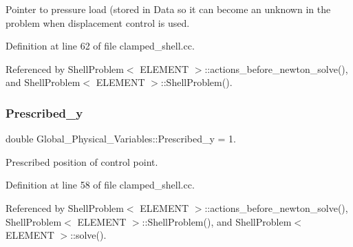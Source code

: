Pointer to pressure load (stored in Data so it can become an unknown in the problem when displacement control is used. 



Definition at line 62 of file clamped\+\_\+shell.\+cc.



Referenced by Shell\+Problem$<$ E\+L\+E\+M\+E\+N\+T $>$\+::actions\+\_\+before\+\_\+newton\+\_\+solve(), and Shell\+Problem$<$ E\+L\+E\+M\+E\+N\+T $>$\+::\+Shell\+Problem().

\mbox{\label{namespaceGlobal__Physical__Variables_aa2f7ea98cb8462b3920a026bed5f6099}} 
\subsubsection{\texorpdfstring{Prescribed\+\_\+y}{Prescribed\_y}}
{\footnotesize\ttfamily double Global\+\_\+\+Physical\+\_\+\+Variables\+::\+Prescribed\+\_\+y = 1.}



Prescribed position of control point. 



Definition at line 58 of file clamped\+\_\+shell.\+cc.



Referenced by Shell\+Problem$<$ E\+L\+E\+M\+E\+N\+T $>$\+::actions\+\_\+before\+\_\+newton\+\_\+solve(), Shell\+Problem$<$ E\+L\+E\+M\+E\+N\+T $>$\+::\+Shell\+Problem(), and Shell\+Problem$<$ E\+L\+E\+M\+E\+N\+T $>$\+::solve().


